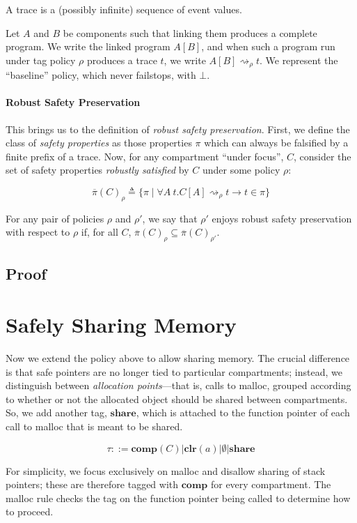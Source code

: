 \documentclass{article}
\begin{document}
A trace is a (possibly infinite) sequence of event values.

Let \(A\) and \(B\) be components such that linking them produces a complete program.
We write the linked program \(A[B]\), and when such a program run under tag
policy \(\rho\) produces a trace \(t\), we write \(A[B] \rightsquigarrow_\rho t\).
We represent the ``baseline'' policy, which never failstops, with \(\bot\).

\paragraph{Robust Safety Preservation}

This brings us to the definition of {\em robust safety preservation}. First, we define the
class of {\em safety properties} as those properties \(\pi\) which can always be falsified by
a finite prefix of a trace. Now, for any compartment ``under focus'', \(C\), consider the set
of safety properties {\em robustly satisfied} by \(C\) under some policy \(\rho\):

\[\overline{\pi}(C)_\rho \triangleq \{ \pi \mid \forall A ~ t .
C[A] \rightsquigarrow_\rho t \rightarrow t \in \pi \}\]

For any pair of policies \(\rho\) and \(\rho'\), we say that \(\rho'\) enjoys robust
safety preservation with respect to \(\rho\) if, for all \(C\),
\(\overline{\pi}(C)_\rho \subseteq \overline{\pi}(C)_{\rho'}\).

\subsection{Proof}

\section{Safely Sharing Memory}

Now we extend the policy above to allow sharing memory. The crucial difference is that
safe pointers are no longer tied to particular compartments; instead, we distinguish
between {\it allocation points}---that is, calls to malloc, grouped according to
whether or not the allocated object should be shared between compartments.
So, we add another tag, \(\mathbf{share}\), which is attached to the function pointer
of each call to malloc that is meant to be shared.

\[\tau ::= \mathbf{comp}(C) | \mathbf{clr}(a) | \emptyset | \mathbf{share} \]

For simplicity, we focus exclusively on malloc and disallow sharing of stack pointers;
these are therefore tagged with \(\mathbf{comp}\) for every compartment. The malloc rule
checks the tag on the function pointer being called to determine how to proceed.
\end{document}
